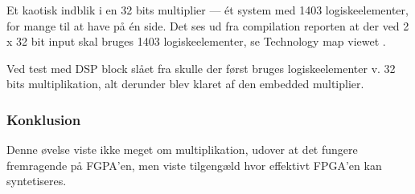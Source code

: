 {Et kaotisk indblik i en 32 bits multiplier --- ét system med 1403 logiskeelementer, for mange til at have på én side.}
Det ses ud fra compilation reporten at der ved 2 x 32 bit input skal bruges 1403 logiskeelementer, se Technology map viewet .

Ved test med DSP block slået fra skulle der først bruges logiskeelementer v. 32 bits multiplikation, alt derunder blev klaret af den embedded multiplier.

\subsubsection{Konklusion}
Denne øvelse viste ikke meget om multiplikation, udover at det fungere fremragende på FGPA'en, men viste tilgengæld hvor effektivt FPGA'en kan syntetiseres.